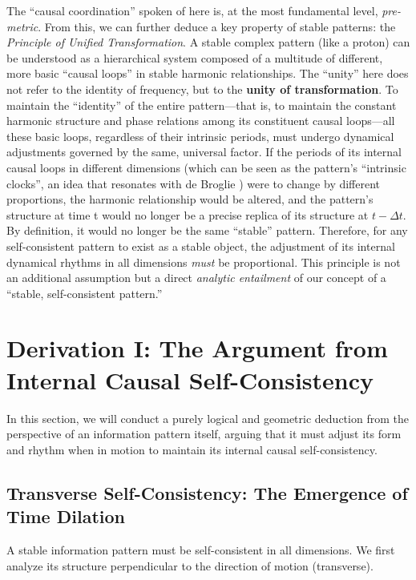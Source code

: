 \documentclass[11pt, a4paper]{article}
\begin{document}
The ``causal coordination'' spoken of here is, at the most fundamental level, \textit{pre-metric}. From this, we can further deduce a key property of stable patterns: the \textit{Principle of Unified Transformation}. A stable complex pattern (like a proton) can be understood as a hierarchical system composed of a multitude of different, more basic ``causal loops'' in stable harmonic relationships. The ``unity'' here does not refer to the identity of frequency, but to the \textbf{unity of transformation}. To maintain the ``identity'' of the entire pattern—that is, to maintain the constant harmonic structure and phase relations among its constituent causal loops—all these basic loops, regardless of their intrinsic periods, must undergo dynamical adjustments governed by the same, universal factor. If the periods of its internal causal loops in different dimensions (which can be seen as the pattern's ``intrinsic clocks'', an idea that resonates with de Broglie \cite{deBroglie1930}) were to change by different proportions, the harmonic relationship would be altered, and the pattern's structure at time t would no longer be a precise replica of its structure at $t - \Delta t$. By definition, it would no longer be the same ``stable'' pattern. Therefore, for any self-consistent pattern to exist as a stable object, the adjustment of its internal dynamical rhythms in all dimensions \textit{must} be proportional. This principle is not an additional assumption but a direct \textit{analytic entailment} of our concept of a ``stable, self-consistent pattern.''

\section{Derivation I: The Argument from Internal Causal Self-Consistency}

In this section, we will conduct a purely logical and geometric deduction from the perspective of an information pattern itself, arguing that it must adjust its form and rhythm when in motion to maintain its internal causal self-consistency.

\subsection{Transverse Self-Consistency: The Emergence of Time Dilation}
A stable information pattern must be self-consistent in all dimensions. We first analyze its structure perpendicular to the direction of motion (transverse).
\end{document}
